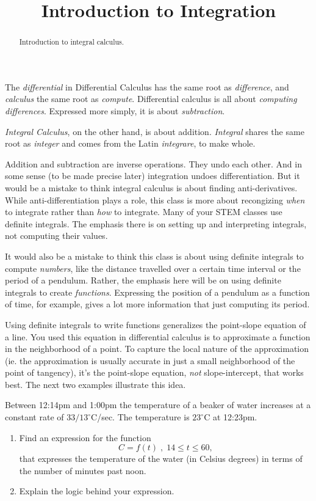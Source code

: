 \documentclass{ximera}
\title{Introduction to Integration}
\begin{document}
\begin{abstract}
Introduction to integral calculus.
\end{abstract}
\maketitle

The \emph{differential} in Differential Calculus has the same root as \emph{difference}, and \emph{calculus} the same root as \emph{compute}. Differential calculus is all about \emph{computing differences}. Expressed more simply, it is about \emph{subtraction}.

\emph{Integral Calculus}, on the other hand, is about addition. \emph{Integral} shares the same root as \emph{integer} and comes from the Latin \emph{integrare}, to make whole. 

Addition and subtraction are inverse operations. They undo each other. And in some sense (to be made precise later) integration
undoes differentiation. But it would be a mistake to think integral calculus is about finding anti-derivatives. While anti-differentiation plays a role, this class is more about recongizing \emph{when} to integrate rather than \emph{how} to integrate. Many of your STEM classes use definite integrals. The emphasis there is on setting up and interpreting integrals, not computing their values. 

It would also be a mistake to think this class is about using definite integrals to compute \emph{numbers}, like the distance travelled over a certain time interval or the period of a pendulum. Rather, the emphasis here will be on using definite integrals to create \emph{functions}. Expressing the position of a pendulum as a function of time, for example, gives a lot more information that just computing its period. 

Using definite integrals to write functions generalizes the point-slope equation of a line. You used this equation in differential calculus is to approximate a function in the neighborhood of a point. To capture the local nature of the approximation (ie. the approximation is usually accurate in just a small neighborhood of the point of tangency), it's the point-slope equation, \emph{not} slope-intercept, that works best. The next two examples illustrate this idea.   %

\begin{example}  \label{Ex:IUDFr3f3fgl}
Between 12:14pm and 1:00pm the temperature of a beaker of water increases at a constant rate of $33/13^\circ$C/sec. The temperature is $23^\circ$C at 12:23pm.

\begin{enumerate}
\item Find an expression for the function 
\[
       C=f(t)\; , \; 14\leq t \leq 60, 
\]
that expresses the temperature of the water (in Celsius degrees) in terms of the number of minutes past noon.

\item Explain the logic behind your expression.

\end{enumerate}
\end{example}
\end{document}
